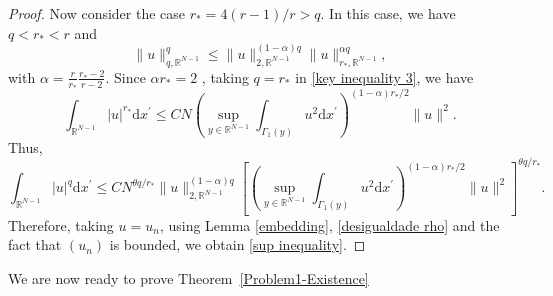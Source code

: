 \documentclass[12pt,reqno]{amsart}
\begin{document}
\begin{proof}
Now consider the case $r_\ast=4(r-1)/r > q$. In this case, we have $q<r_\ast<r$ and
\begin{equation*}
    \|u\|_{q,\mathds{R}^{N-1}}^q\leq \|u\|_{2,\mathds{R}^{N-1}}^{(1-\alpha)q}\|u\|_{r_\ast,\mathds{R}^{N-1}}^{\alpha q},
\end{equation*}
with $\alpha=\frac{r}{r_\ast}\frac{r_\ast-2}{r-2}$. Since $\alpha r_\ast=2$ , taking $q=r_\ast$ in \eqref{key inequality 3}, we have 
\begin{equation*}
      \int_{\mathds{R}^{N-1}}|u|^{r_\ast}\mathrm{d}x^\prime \leq CN \left(\sup_{y \in \mathds{R}^{N-1}}\int_{ \Gamma_1(y)}u^2\mathrm{d}x^\prime\right)^{(1-\alpha)r_\ast/2} \|u\|  ^{2}.
\end{equation*}
Thus,
\begin{equation*}
    \int_{\mathds{R}^{N-1}}|u|^q\mathrm{d}x^\prime\leq CN^{\theta q/r_\ast}\|u\|_{2,\mathds{R}^{N-1}}^{(1-\alpha)q} \left[\left(\sup_{y \in \mathds{R}^{N-1}}\int_{ \Gamma_1(y)}u^2\mathrm{d}x^\prime\right)^{(1-\alpha)r_\ast/2} \|u\| ^2\right]^{\theta q/r_\ast}.
\end{equation*}
Therefore, taking $u=u_n$, using Lemma \ref{embedding}, \eqref{desigualdade rho} and the fact that $(u_n)$ is bounded, we obtain \eqref{sup inequality}.
\end{proof}

We are now ready to prove Theorem~\ref{Problem1-Existence}
\end{document}
